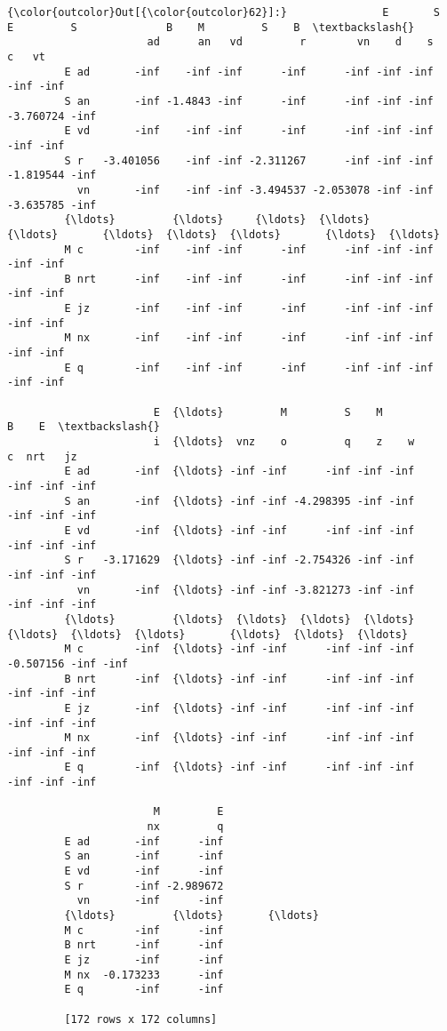 \documentclass[11pt]{article}
\begin{document}
\begin{Verbatim}[commandchars=\\\{\}]
{\color{outcolor}Out[{\color{outcolor}62}]:}               E       S    E         S              B    M         S    B  \textbackslash{}
                      ad      an   vd         r        vn    d    s         c   vt   
         E ad       -inf    -inf -inf      -inf      -inf -inf -inf      -inf -inf   
         S an       -inf -1.4843 -inf      -inf      -inf -inf -inf -3.760724 -inf   
         E vd       -inf    -inf -inf      -inf      -inf -inf -inf      -inf -inf   
         S r   -3.401056    -inf -inf -2.311267      -inf -inf -inf -1.819544 -inf   
           vn       -inf    -inf -inf -3.494537 -2.053078 -inf -inf -3.635785 -inf   
         {\ldots}         {\ldots}     {\ldots}  {\ldots}       {\ldots}       {\ldots}  {\ldots}  {\ldots}       {\ldots}  {\ldots}   
         M c        -inf    -inf -inf      -inf      -inf -inf -inf      -inf -inf   
         B nrt      -inf    -inf -inf      -inf      -inf -inf -inf      -inf -inf   
         E jz       -inf    -inf -inf      -inf      -inf -inf -inf      -inf -inf   
         M nx       -inf    -inf -inf      -inf      -inf -inf -inf      -inf -inf   
         E q        -inf    -inf -inf      -inf      -inf -inf -inf      -inf -inf   
         
                       E  {\ldots}         M         S    M                   B    E  \textbackslash{}
                       i  {\ldots}  vnz    o         q    z    w         c  nrt   jz   
         E ad       -inf  {\ldots} -inf -inf      -inf -inf -inf      -inf -inf -inf   
         S an       -inf  {\ldots} -inf -inf -4.298395 -inf -inf      -inf -inf -inf   
         E vd       -inf  {\ldots} -inf -inf      -inf -inf -inf      -inf -inf -inf   
         S r   -3.171629  {\ldots} -inf -inf -2.754326 -inf -inf      -inf -inf -inf   
           vn       -inf  {\ldots} -inf -inf -3.821273 -inf -inf      -inf -inf -inf   
         {\ldots}         {\ldots}  {\ldots}  {\ldots}  {\ldots}       {\ldots}  {\ldots}  {\ldots}       {\ldots}  {\ldots}  {\ldots}   
         M c        -inf  {\ldots} -inf -inf      -inf -inf -inf -0.507156 -inf -inf   
         B nrt      -inf  {\ldots} -inf -inf      -inf -inf -inf      -inf -inf -inf   
         E jz       -inf  {\ldots} -inf -inf      -inf -inf -inf      -inf -inf -inf   
         M nx       -inf  {\ldots} -inf -inf      -inf -inf -inf      -inf -inf -inf   
         E q        -inf  {\ldots} -inf -inf      -inf -inf -inf      -inf -inf -inf   
         
                       M         E  
                      nx         q  
         E ad       -inf      -inf  
         S an       -inf      -inf  
         E vd       -inf      -inf  
         S r        -inf -2.989672  
           vn       -inf      -inf  
         {\ldots}         {\ldots}       {\ldots}  
         M c        -inf      -inf  
         B nrt      -inf      -inf  
         E jz       -inf      -inf  
         M nx  -0.173233      -inf  
         E q        -inf      -inf  
         
         [172 rows x 172 columns]
\end{Verbatim}
            
\end{document}
